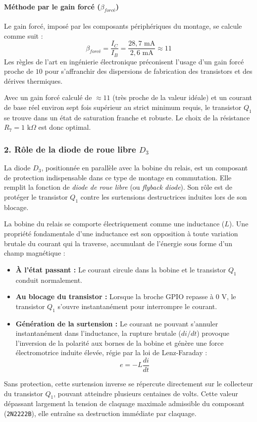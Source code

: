 \paragraph{Méthode par le gain forcé ($\beta_{forcé}$)} 
Le gain forcé, imposé par les composants périphériques du montage, se calcule comme suit :
\begin{equation}
    \beta_{forcé} = \frac{I_C}{I_B} = \frac{28{,}7\text{ mA}}{2{,}6\text{ mA}} \approx 11
\end{equation}
Les règles de l'art en ingénierie électronique préconisent l'usage d'un gain forcé proche de $10$ 
pour s'affranchir des dispersions de fabrication des transistors et des dérives thermiques. 

\bigskip
Avec un gain forcé calculé de $\approx 11$ (très proche de la valeur idéale) et un courant 
de base réel environ sept fois supérieur au strict minimum requis, le transistor $Q_1$ 
se trouve dans un état de saturation franche et robuste. Le choix de la résistance
$R_7 = 1\text{ k}\Omega$ est donc optimal.

\subsubsection*{2. Rôle de la diode de roue libre $D_3$}

La diode $D_3$, positionnée en parallèle avec la bobine du relais, est un composant 
de protection indispensable dans ce type de montage en commutation. 
Elle remplit la fonction de \textit{diode de roue libre} (ou \textit{flyback diode}). 
Son rôle est de protéger le transistor $Q_1$ contre les surtensions destructrices induites 
lors de son blocage.

\bigskip
La bobine du relais se comporte électriquement comme une inductance ($L$). Une propriété 
fondamentale d'une inductance est son opposition à toute variation brutale du courant qui 
la traverse, accumulant de l'énergie sous forme d'un champ magnétique :
\begin{itemize}
    \item \textbf{À l'état passant :} Le courant circule dans la bobine et le transistor $Q_1$ conduit normalement.
    \item \textbf{Au blocage du transistor :} Lorsque la broche GPIO repasse à $0\text{ V}$, le transistor $Q_1$ s'ouvre instantanément pour interrompre le courant. 
    \item \textbf{Génération de la surtension :} Le courant ne pouvant s'annuler instantanément dans l'inductance, la rupture brutale ($di/dt$) provoque l'inversion de la polarité aux bornes de la bobine et génère une force électromotrice induite élevée, régie par la loi de Lenz-Faraday :
    \begin{equation}
        e = -L \frac{di}{dt}
    \end{equation}
\end{itemize}
Sans protection, cette surtension inverse se répercute directement sur le collecteur du 
transistor $Q_1$, pouvant atteindre plusieurs centaines de volts. Cette valeur dépassant
largement la tension de claquage maximale admissible du composant (\texttt{2N2222B}), 
elle entraîne sa destruction immédiate par claquage.

